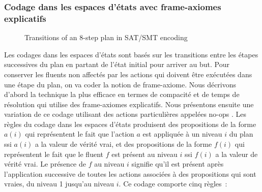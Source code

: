 %
%


{\color{red}

\subsubsection{Codage dans les espaces d'états avec frame-axiomes explicatifs}

\begin{figure}\label{steps:sat}
\begin{footnotesize}

\end{footnotesize}
\vspace{1em}
\caption{Transitions of an 8-step plan in SAT/SMT encoding}
\end{figure}


Les codages dans les espaces d'états sont basés sur les transitions entre les étapes successives du plan en partant de l'état initial pour arriver au but.
Pour conserver les fluents non affectés par les actions qui doivent être exécutées dans une étape du plan, on va coder la notion de frame-axiome.
Nous décrivons d'abord la technique la plus efficace en termes de compacité et
de temps de résolution \cite{MK99} qui utilise des frame-axiomes explicatifs.
Nous présentons ensuite une variation de ce codage utilisant des actions
particulières appelées no-ops \cite{KMS96}.
Les règles du codage dans les espaces d'états produisent des propositions de la
forme $a(i)$ qui représentent le fait que l'action $a$ est appliquée à un niveau
$i$ du plan ssi $a(i)$ a la valeur de vérité vrai, et des propositions de la
forme $f(i)$ qui représentent le fait que le fluent $f$ est présent au niveau
$i$ ssi $f(i)$ a la valeur de vérité vrai. Le présence de $f$ au niveau $i$
signifie qu'il est présent après l'application successive de toutes les
actions associées à des propositions qui sont vraies, du niveau 1 jusqu'au
niveau $i$. Ce codage comporte cinq règles~:

}
